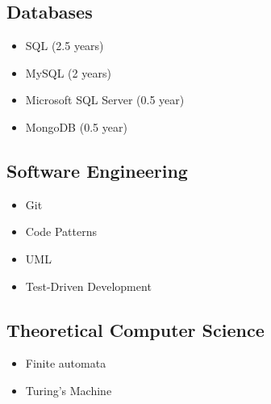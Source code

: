 \documentclass[a4paper,12pt]{article}
\begin{document}
\subsection*{Databases}

\begin{multicols}{2}
\begin{itemize}
    \item SQL (2.5 years)
    \item MySQL (2 years)
    \item Microsoft SQL Server (0.5 year)
    \item MongoDB (0.5 year)
\end{itemize}
\end{multicols}

\subsection*{Software Engineering}

\begin{multicols}{2}
\begin{itemize}
    \item Git
    \item Code Patterns
    \item UML
    \item Test-Driven Development 
\end{itemize}
\end{multicols}

\subsection*{Theoretical Computer Science}

\begin{multicols}{2}

\begin{itemize}
    \item Finite automata
    \item Turing's Machine
\end{itemize}

\end{multicols}
\end{document}
